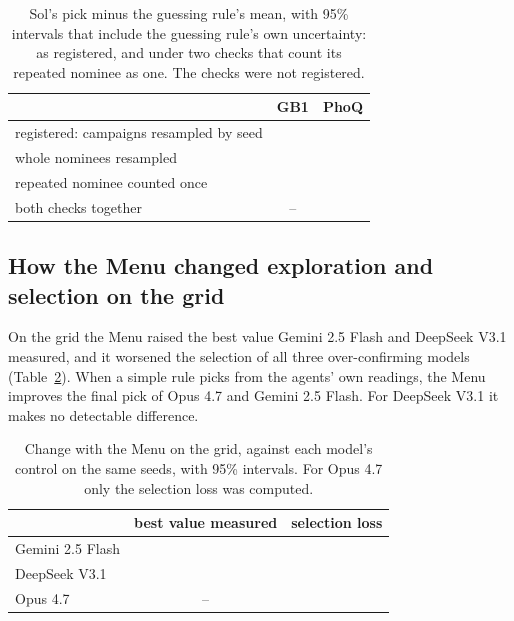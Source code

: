 \begin{table}[tbp]
\centering
\small
\caption{Sol's pick minus the guessing rule's mean, with 95\% intervals that include the guessing rule's own
uncertainty: as registered, and under two checks that count its repeated nominee as one. The checks were not
registered.}
\label{tab:sollead}
\begin{tabular}{lcc}
\toprule
 & GB1 & PhoQ \\
\midrule
registered: campaigns resampled by seed & \estci{\nSolGbLeadReg}{\nSolGbLeadRegci} & \estci{\nPqSolLeadReg}{\nPqSolLeadRegci} \\
whole nominees resampled & \estci{\nSolGbLeadClu}{\nSolGbLeadCluci} & \estci{\nPqSolLeadNom}{\nPqSolLeadNomci} \\
repeated nominee counted once & \estci{\nSolGbLeadCol}{\nSolGbLeadColci} & \estci{\nPqSolLeadOnce}{\nPqSolLeadOnceci} \\
both checks together & -- & \estci{\nPqSolLeadOnceNom}{\nPqSolLeadOnceNomci} \\
\bottomrule
\end{tabular}
\end{table}

\subsection{How the Menu changed exploration and selection on the grid}
\label{app:split}

On the grid the Menu raised the best value Gemini 2.5 Flash and DeepSeek V3.1 measured, and it worsened the selection
of all three over-confirming models (Table~\ref{tab:split}). When a simple rule picks from the agents' own readings, the Menu improves the final pick of Opus 4.7 and Gemini 2.5 Flash. For DeepSeek V3.1 it makes no detectable difference.

\begin{table}[tbp]
\centering
\small
\caption{Change with the Menu on the grid, against each model's control on the same seeds, with 95\% intervals. For
Opus 4.7 only the selection loss was computed.}
\label{tab:split}
\begin{tabular}{lcc}
\toprule
 & best value measured & selection loss \\
\midrule
Gemini 2.5 Flash & \estci{\nSplitFlashExpl}{\nSplitFlashExplci} & \estci{\nSplitFlashSel}{\nSplitFlashSelci} \\
DeepSeek V3.1 & \estci{\nSplitDeepExpl}{\nSplitDeepExplci} & \estci{\nSplitDeepSel}{\nSplitDeepSelci} \\
Opus 4.7 & -- & \estci{\nSplitOpusSel}{\nSplitOpusSelci} \\
\bottomrule
\end{tabular}
\end{table}

